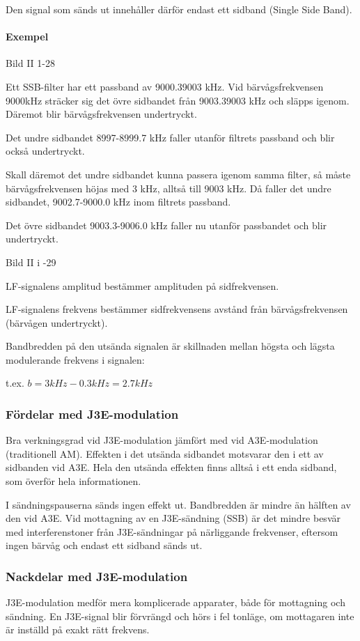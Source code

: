 Den signal som sänds ut innehåller därför endast ett sidband (Single Side Band).

\paragraph{Exempel}

Bild II 1-28

Ett SSB-filter har ett passband av 9000.39003 kHz. Vid bärvågsfrekvensen 9000kHz
sträcker sig det övre sidbandet från 9003.39003 kHz och släpps igenom. Däremot blir
bärvågsfrekvensen undertryckt.

Det undre sidbandet 8997-8999.7 kHz faller utanför filtrets passband och blir också
undertryckt.

Skall däremot det undre sidbandet kunna passera igenom samma filter, så måste
bärvågsfrekvensen höjas med 3 kHz, alltså till 9003 kHz. Då faller det undre sidbandet,
9002.7-9000.0 kHz inom filtrets passband.

Det övre sidbandet 9003.3-9006.0 kHz faller nu utanför passbandet och blir undertryckt.

Bild II i -29

LF-signalens amplitud bestämmer amplituden på sidfrekvensen.

LF-signalens frekvens bestämmer sidfrekvensens avstånd från bärvågsfrekvensen (bärvågen
undertryckt).

Bandbredden på den utsända signalen är skillnaden mellan högsta och lägsta
modulerande frekvens i signalen:

t.ex. $b = 3kHz - 0.3 kHz = 2.7 kHz$

\subsubsection{Fördelar med J3E-modulation}
Bra verkningsgrad vid J3E-modulation jämfört med vid A3E-modulation (traditionell AM).
Effekten i det utsända sidbandet motsvarar den i ett av sidbanden vid A3E. Hela den
utsända effekten finns alltså i ett enda sidband, som överför hela informationen.

I sändningspauserna sänds ingen effekt ut. Bandbredden är mindre än hälften av den
vid A3E. Vid mottagning av en J3E-sändning (SSB) är det mindre besvär med interferenstoner
från J3E-sändningar på närliggande frekvenser, eftersom ingen bärvåg och endast ett
sidband sänds ut.

\subsubsection{Nackdelar med J3E-modulation}
J3E-modulation medför mera komplicerade apparater, både för mottagning och sändning.
En J3E-signal blir förvrängd och hörs i fel tonläge, om mottagaren inte är inställd på
exakt rätt frekvens.

